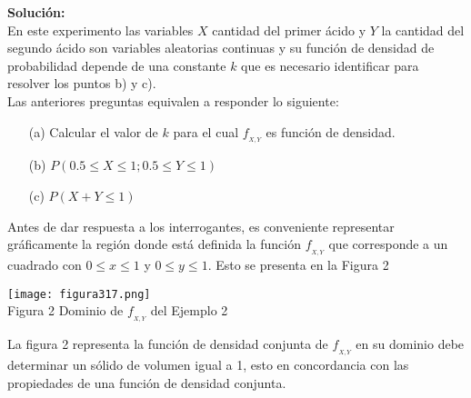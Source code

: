 \documentclass[base=hide,12pt]{elegantbook}
\begin{document}
\vspace{.5cm}	
\textcolor{col3}{\bf \large Solución:}\\
En este experimento las variables  $X$ cantidad del  primer ácido  y $Y$ la cantidad del segundo ácido son  variables  aleatorias continuas y su  función de densidad de probabilidad depende de una  constante $k$  que es necesario identificar para resolver los puntos b) y c). \\
%				
Las anteriores preguntas equivalen a responder lo siguiente:
%				
\begin{itemize}
	\item[(a)]Calcular el valor de $k$ para el cual $f_{_{X,Y}}$ es función de densidad.
	\item[(b)]$P(0.5 \leq X \leq 1; 0.5 \leq Y \leq 1)$
	\item[(c)]$P(X + Y \leq 1)$
\end{itemize}
%				
Antes de dar respuesta a los interrogantes, es conveniente representar gráficamente la región donde está definida la función $f_{_{X,Y}}$ que corresponde a un cuadrado con $0\leq x\leq 1$ y $0\leq y\leq 1$. Esto se presenta en la Figura 2
%				
%				
\begin{center}
\texttt{[image: figura317.png]}\\
Figura 2 Dominio de $f_{_{X,Y}}$ del Ejemplo 2
\end{center}

La figura 2  representa la  función de densidad conjunta de $f_{_{X,Y}}$ en su dominio debe determinar un sólido de volumen igual a 1, esto en concordancia con las propiedades de una función de densidad conjunta.
		
\end{document}
